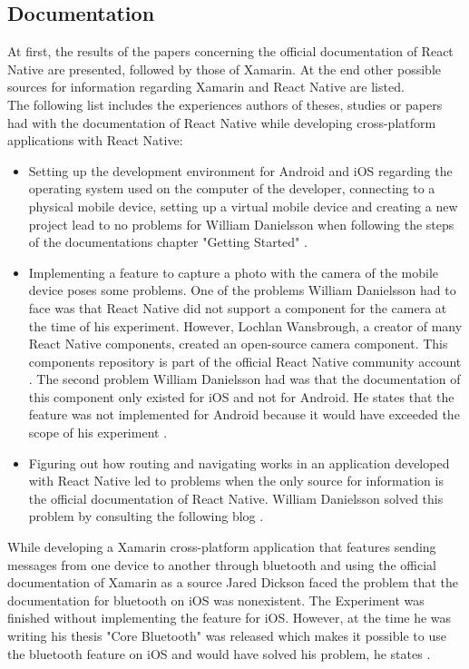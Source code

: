 \documentclass[Bachelor,BIF,english]{twbook}
\begin{document}
\subsection{Documentation}
At first, the results of the papers concerning the official documentation of React Native are presented, followed by those of Xamarin. At the end other possible sources for information regarding Xamarin and React Native are listed. 
\\[\baselineskip]
The following list includes the experiences authors of theses, studies or papers had with the documentation of React Native \cite{ReactNativeDoc} while developing cross-platform applications with React Native: 
\begin{itemize}
\item Setting up the development environment for Android and iOS regarding the operating system used on the computer of the developer, connecting to a physical mobile device, setting up a virtual mobile device and creating a new project lead to no problems for William Danielsson when following the steps of the documentations chapter "Getting Started" \cite[p.~18]{Danielsson_2016}.
\item Implementing a feature to capture a photo with the camera of the mobile device poses some problems. One of the problems William Danielsson had to face was that React Native did not support a component for the camera at the time of his experiment. However, Lochlan Wansbrough, a creator of many React Native components, created an open-source camera component. This components repository \cite{ReactNativeCamera} is part of the official React Native community account \cite{ReactNativeCommunity}. The second problem William Danielsson had was that the documentation of this component only existed for iOS and not for Android. He states that the feature was not implemented for Android because it would have exceeded the scope of his experiment \cite[p.~23-24]{Danielsson_2016}.
\item Figuring out how routing and navigating works in an application developed with React Native led to problems when the only source for information is the official documentation of React Native. William Danielsson solved this problem by consulting the following blog \cite{ReactNativeBlog} \cite[p.~51]{Danielsson_2016}.
\end{itemize}
While developing a Xamarin cross-platform application that features sending messages from one device to another through bluetooth and using the official documentation of Xamarin \cite{XamarinDoc} as a source Jared Dickson faced the problem that the documentation for bluetooth on iOS was nonexistent. The Experiment was finished without implementing the feature for iOS. However, at the time he was writing his thesis "Core Bluetooth" was released which makes it possible to use the bluetooth feature on iOS and would have solved his problem, he states \cite[p.~11]{Dickson_2013}.
\end{document}
